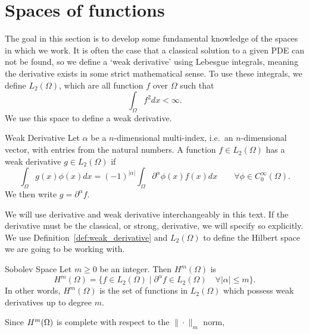 \section{Spaces of functions}
The goal in this section is to develop some 
fundamental knowledge of the spaces in which we work.
It is often the case that a classical solution to a given PDE can 
not be found, 
so we define a `weak derivative' using Lebesgue integrals, meaning 
the derivative exists in some strict mathematical sense. 
To use these integrals, we define $L_2(\Omega)$, which are all 
function $f$ over $\Omega$ such that 
\begin{equation*}
   \int_\Omega f^2 dx < \infty. 
\end{equation*}
We use this space to define a weak derivative.
\begin{defn}{Weak Derivative}
   Let $\alpha$ be a $n$-dimensional multi-index, i.e.\ an $n$-dimensional vector, 
   with entries from the natural numbers.
    A function $f \in L_2(\Omega)$ has a weak derivative $g \in L_2(\Omega)$
    if
    \begin{equation*}
        \int_\Omega g(x)\phi(x) dx = {(-1)}^{|\alpha|}\int_\Omega 
        \partial ^{\alpha}\phi(x) f(x) dx
        \quad\quad \forall \phi \in C^\infty_0(\Omega).
    \end{equation*}
    We then write $g=\partial ^{\alpha}f$.\label{def:weak_derivative}
\end{defn}
We will use derivative and weak derivative interchangeably in this 
text.
If the derivative must be the classical, or strong, derivative, we will 
specify so explicitly. 
We use Definition~\ref{def:weak_derivative} and $L_2(\Omega)$ to 
define the Hilbert space we are going to be working with. 
\begin{defn}{Sobolev Space}
   Let $m \geq 0$ be an integer. Then $H^m(\Omega)$ is 
   \begin{equation*}
    H^m(\Omega) = \{  f \in L_2(\Omega) \mid \partial ^{\alpha}f \in 
    L_2(\Omega) \quad \forall |\alpha| \leq m  \}.
   \end{equation*}
   In other words, $H^m(\Omega)$ is the set of functions in $L_2(\Omega)$ 
   which possess weak derivatives up to degree $m$.
\end{defn}
Since $H^m(\Omega)$ is complete with respect to the $\| \cdot\|_m$ norm, 
